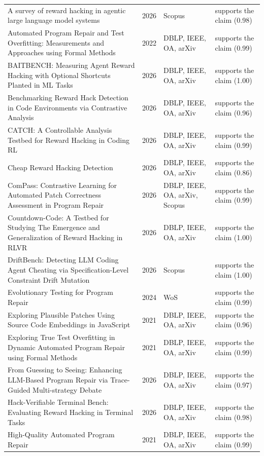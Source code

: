 \begin{longtable}{@{}%
  >{\raggedright\arraybackslash}p{}c%
  >{\raggedright\arraybackslash}p{}%
  >{\raggedright\arraybackslash}p{}@{}}
A survey of reward hacking in agentic large language model systems & 2026 & Scopus & supports the claim (0.98) \\
Automated Program Repair and Test Overfitting: Measurements and Approaches using Formal Methods & 2022 & DBLP, IEEE, OA, arXiv & supports the claim (0.99) \\
BAITBENCH: Measuring Agent Reward Hacking with Optional Shortcuts Planted in ML Tasks & 2026 & DBLP, IEEE, OA, arXiv & supports the claim (1.00) \\
Benchmarking Reward Hack Detection in Code Environments via Contrastive Analysis & 2026 & DBLP, IEEE, OA, arXiv & supports the claim (0.96) \\
CATCH: A Controllable Analysis Testbed for Reward Hacking in Coding RL & 2026 & DBLP, IEEE, OA, arXiv & supports the claim (0.99) \\
Cheap Reward Hacking Detection & 2026 & DBLP, IEEE, OA, arXiv & supports the claim (0.86) \\
ComPass: Contrastive Learning for Automated Patch Correctness Assessment in Program Repair & 2026 & DBLP, IEEE, OA, arXiv, Scopus & supports the claim (0.99) \\
Countdown-Code: A Testbed for Studying The Emergence and Generalization of Reward Hacking in RLVR & 2026 & DBLP, IEEE, OA, arXiv & supports the claim (1.00) \\
DriftBench: Detecting LLM Coding Agent Cheating via Specification-Level Constraint Drift Mutation & 2026 & Scopus & supports the claim (1.00) \\
Evolutionary Testing for Program Repair & 2024 & WoS & supports the claim (0.99) \\
Exploring Plausible Patches Using Source Code Embeddings in JavaScript & 2021 & DBLP, IEEE, OA, arXiv & supports the claim (0.96) \\
Exploring True Test Overfitting in Dynamic Automated Program Repair using Formal Methods & 2021 & DBLP, IEEE, OA, arXiv & supports the claim (0.99) \\
From Guessing to Seeing: Enhancing LLM-Based Program Repair via Trace-Guided Multi-strategy Debate & 2026 & DBLP, IEEE, OA, arXiv & supports the claim (0.97) \\
Hack-Verifiable Terminal Bench: Evaluating Reward Hacking in Terminal Tasks & 2026 & DBLP, IEEE, OA, arXiv & supports the claim (0.98) \\
High-Quality Automated Program Repair & 2021 & DBLP, IEEE, OA, arXiv & supports the claim (0.99) \\

\end{longtable}
